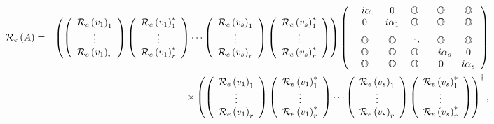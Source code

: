 \begin{eqnarray}
{\cal R}_{e}\left( A\right) &=&\left( \left( 
\begin{array}{c}
{\cal R}_{e}\left( v_{1}\right) _{1} \\ 
\vdots \\ 
{\cal R}_{e}\left( v_{1}\right) _{r}%
\end{array}%
\right) \left( 
\begin{array}{c}
{\cal R}_{e}\left( v_{1}\right) _{1}^{\ast } \\ 
\vdots \\ 
{\cal R}_{e}\left( v_{1}\right) _{r}^{\ast }%
\end{array}%
\right) \cdots \left( 
\begin{array}{c}
{\cal R}_{e}\left( v_{s}\right) _{1} \\ 
\vdots \\ 
{\cal R}_{e}\left( v_{s}\right) _{r}%
\end{array}%
\right) \left( 
\begin{array}{c}
{\cal R}_{e}\left( v_{s}\right) _{1}^{\ast } \\ 
\vdots \\ 
{\cal R}_{e}\left( v_{s}\right) _{r}^{\ast }%
\end{array}%
\right) \right) \left( 
\begin{array}{ccccc}
-i\alpha _{1} & 0 & {\Bbb O} & {\Bbb O} & {\Bbb O} \\ 
0 & i\alpha _{1} & {\Bbb O} & {\Bbb O} & {\Bbb O} \\ 
{\Bbb O} & {\Bbb O} & \ddots & {\Bbb O} & {\Bbb O} \\ 
{\Bbb O} & {\Bbb O} & {\Bbb O} & -i\alpha _{s} & 0 \\ 
{\Bbb O} & {\Bbb O} & {\Bbb O} & 0 & i\alpha _{s}%
\end{array}%
\right) \\
&&\times \left( \left( 
\begin{array}{c}
{\cal R}_{e}\left( v_{1}\right) _{1} \\ 
\vdots \\ 
{\cal R}_{e}\left( v_{1}\right) _{r}%
\end{array}%
\right) \left( 
\begin{array}{c}
{\cal R}_{e}\left( v_{1}\right) _{1}^{\ast } \\ 
\vdots \\ 
{\cal R}_{e}\left( v_{1}\right) _{r}^{\ast }%
\end{array}%
\right) \cdots \left( 
\begin{array}{c}
{\cal R}_{e}\left( v_{s}\right) _{1} \\ 
\vdots \\ 
{\cal R}_{e}\left( v_{s}\right) _{r}%
\end{array}%
\right) \left( 
\begin{array}{c}
{\cal R}_{e}\left( v_{s}\right) _{1}^{\ast } \\ 
\vdots \\ 
{\cal R}_{e}\left( v_{s}\right) _{r}^{\ast }%
\end{array}%
\right) \right) ^{\dagger },
\end{eqnarray}%
